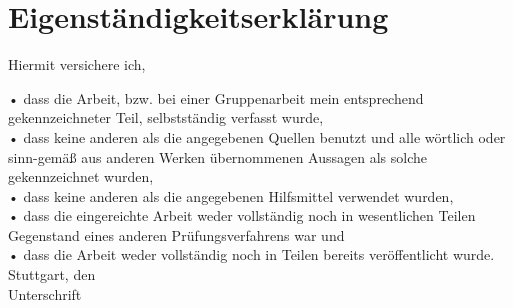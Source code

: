

\section*{Eigenständigkeitserklärung} 
\thispagestyle{empty}

\bigskip

Hiermit versichere ich,

•	dass die Arbeit, bzw. bei einer Gruppenarbeit mein entsprechend gekennzeichneter Teil, selbstständig verfasst wurde, \\[0.5cm]
•	dass keine anderen als die angegebenen Quellen benutzt und alle wörtlich oder sinn-gemäß aus anderen Werken übernommenen Aussagen als solche gekennzeichnet wurden,\\[0.5cm]
•	dass keine anderen als die angegebenen Hilfsmittel verwendet wurden,\\[0.5cm]
•	dass die eingereichte Arbeit weder vollständig noch in wesentlichen Teilen Gegenstand eines anderen Prüfungsverfahrens war und\\[0.5cm]
•	dass die Arbeit weder vollständig noch in Teilen bereits veröffentlicht wurde.\\[2cm]


Stuttgart, den\\ 

Unterschrift
